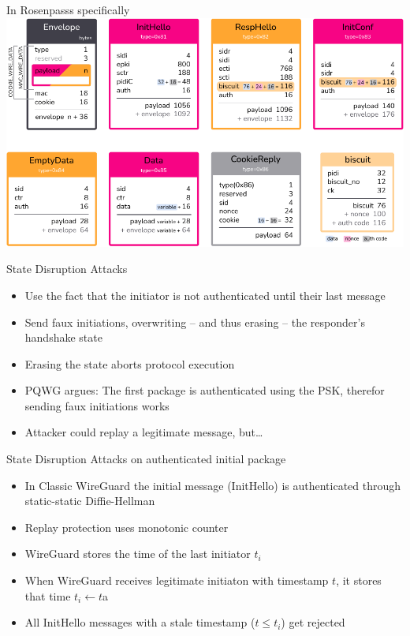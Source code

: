 \begin{frame}{In Rosenpasss specifically}
  \includegraphics[height=.80\textheight]{graphics/rosenpass-wp-message-types-rgb.pdf}
\end{frame}

\begin{frame}{State Disruption Attacks}
\begin{itemize}
  \item Use the fact that the initiator is not authenticated until their last message
  \item Send faux initiations, overwriting – and thus erasing – the responder's handshake state
  \item Erasing the state aborts protocol execution
  \item PQWG argues: The first package is authenticated using the PSK, therefor sending faux initiations works
  \item Attacker could replay a legitimate message, but…
\end{itemize}
\end{frame}

\begin{frame}{State Disruption Attacks on authenticated initial package}
\begin{itemize}
  \item In Classic WireGuard the initial message (InitHello) is authenticated through static-static Diffie-Hellman
  \item Replay protection uses monotonic counter
  \item WireGuard stores the time of the last initiator $t_i$
  \item When WireGuard receives legitimate initiaton with timestamp $t$, it stores that time $t_i \leftarrow t$a
  \item All InitHello messages with a stale timestamp ($t \le t_i$) get rejected
\end{itemize}
\end{frame}

